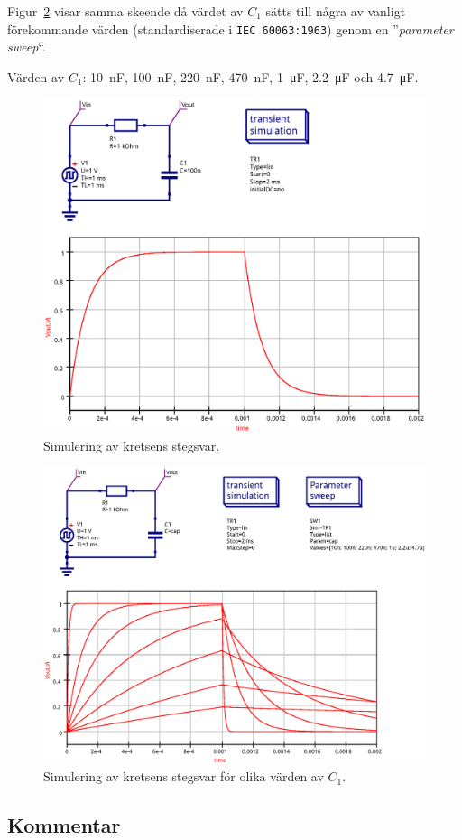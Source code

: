 Figur~\ref{fig:step-sim-param} visar samma skeende då värdet av $C_1$ sätts
till några av vanligt förekommande värden (standardiserade i \texttt{IEC
60063:1963}) genom en ''\emph{parameter sweep}``.  \par
Värden av $C_1$: \SI{10}{\nano\farad},  \SI{100}{\nano\farad},
                 \SI{220}{\nano\farad}, \SI{470}{\nano\farad},
                 \SI{1}{\micro\farad},  \SI{2.2}{\micro\farad}
             och \SI{4.7}{\micro\farad}.


\begin{figure}[ht]\label{fig:step-sim-step}
  \centering
  \includegraphics[width=\linewidth]{sim/ee466_lab-4_prj/uppgift-2_step}
  \caption[] {Simulering av kretsens stegsvar.}
\end{figure}

\begin{figure}[ht]\label{fig:step-sim-param}
  \centering
  \includegraphics[width=\linewidth]{sim/ee466_lab-4_prj/uppgift-2_param}
  \caption[] {Simulering av kretsens stegsvar för olika värden av $C_1$.}
\end{figure}


\subsection{Kommentar}\label{}

